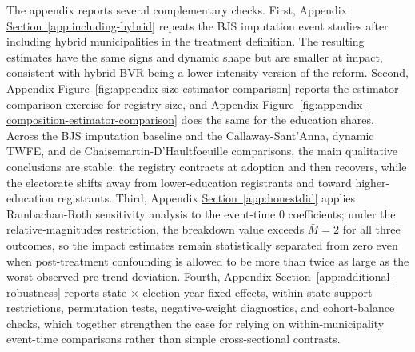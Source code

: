 The appendix reports several complementary checks. First, Appendix \hyperref[app:including-hybrid]{Section~\ref*{app:including-hybrid}} repeats the BJS imputation event studies after including hybrid municipalities in the treatment definition. The resulting estimates have the same signs and dynamic shape but are smaller at impact, consistent with hybrid BVR being a lower-intensity version of the reform. Second, Appendix \hyperref[fig:appendix-size-estimator-comparison]{Figure~\ref*{fig:appendix-size-estimator-comparison}} reports the estimator-comparison exercise for registry size, and Appendix \hyperref[fig:appendix-composition-estimator-comparison]{Figure~\ref*{fig:appendix-composition-estimator-comparison}} does the same for the education shares. Across the BJS imputation baseline and the Callaway-Sant'Anna, dynamic TWFE, and de Chaisemartin-D'Haultfoeuille comparisons, the main qualitative conclusions are stable: the registry contracts at adoption and then recovers, while the electorate shifts away from lower-education registrants and toward higher-education registrants. Third, Appendix \hyperref[app:honestdid]{Section~\ref*{app:honestdid}} applies Rambachan-Roth sensitivity analysis to the event-time $0$ coefficients; under the relative-magnitudes restriction, the breakdown value exceeds $\bar{M}=2$ for all three outcomes, so the impact estimates remain statistically separated from zero even when post-treatment confounding is allowed to be more than twice as large as the worst observed pre-trend deviation. Fourth, Appendix \hyperref[app:additional-robustness]{Section~\ref*{app:additional-robustness}} reports state $\times$ election-year fixed effects, within-state-support restrictions, permutation tests, negative-weight diagnostics, and cohort-balance checks, which together strengthen the case for relying on within-municipality event-time comparisons rather than simple cross-sectional contrasts.
